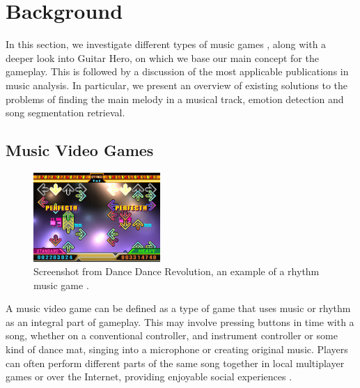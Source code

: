 
\chapter{Background} 

\label{Chapter4} 



In this section, we investigate different types of music games \cite{gametypes}, along with a deeper look into Guitar Hero, on which we base our main concept for the gameplay. This is followed by a discussion of the most applicable publications in music analysis. In particular, we present an overview of existing solutions to the problems of finding the main melody in a musical track, emotion detection and song segmentation retrieval.

\vspace{20pt}


\section{Music Video Games }

\begin{figure}
  \vspace{-40pt}

  \begin{center}
    \includegraphics[width=0.43\textwidth]{Figures/dancedancerevolution}
  \end{center}
  \caption{Screenshot from Dance Dance Revolution, an example of a rhythm music game \cite{DDR}.}
  \label{fig:DDR}
\end{figure}

A music video game can be defined as a type of game that uses music or rhythm as an integral part of gameplay. This may involve pressing buttons in time with a song, whether on a conventional controller, and instrument controller or some kind of dance mat, singing into a microphone or creating original music. Players can often perform different parts of the same song together in local multiplayer games or over the Internet, providing enjoyable social experiences \cite{mvgdef}.

